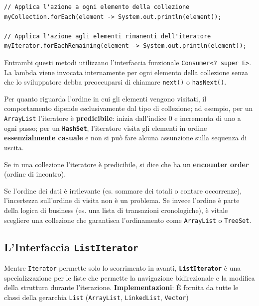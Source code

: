 \begin{lstlisting}[caption={Esempi di iterazione funzionale}]
// Applica l'azione a ogni elemento della collezione
myCollection.forEach(element -> System.out.println(element));

// Applica l'azione agli elementi rimanenti dell'iteratore
myIterator.forEachRemaining(element -> System.out.println(element));
\end{lstlisting}

Entrambi questi metodi utilizzano l'interfaccia funzionale \texttt{Consumer<? super E>}. La lambda viene invocata internamente per ogni elemento della collezione senza che lo sviluppatore debba preoccuparsi di chiamare \texttt{next()} o \texttt{hasNext()}.

Per quanto riguarda l'ordine in cui gli elementi vengono visitati, il comportamento dipende esclusivamente dal tipo di collezione; ad esempio, per un {\texttt{ArrayList}} l'iteratore è \textbf{predicibile}: inizia dall'indice 0 e incrementa di uno a ogni passo; per un \textbf{\texttt{HashSet}}, l'iteratore visita gli elementi in ordine \textbf{essenzialmente casuale} e non si può fare alcuna assunzione sulla sequenza di uscita.

Se in una collezione l'iteratore è predicibile, si dice che ha un \textbf{encounter order} (ordine di incontro).

\begin{tip}
Se l'ordine dei dati è irrilevante (es. sommare dei totali o contare occorrenze), l'incertezza sull'ordine di visita non è un problema. Se invece l'ordine è parte della logica di business (es. una lista di transazioni cronologiche), è vitale scegliere una collezione che garantisca l'ordinamento come \texttt{ArrayList} o \texttt{TreeSet}.
\end{tip}

\subsection{L'Interfaccia \texttt{ListIterator}}

Mentre \texttt{Iterator} permette solo lo scorrimento in avanti, \textbf{\texttt{ListIterator}} è una specializzazione per le liste che permette la navigazione bidirezionale e la modifica della struttura durante l'iterazione. \textbf{Implementazioni}: È fornita da tutte le classi della gerarchia \texttt{List} (\texttt{ArrayList}, \texttt{LinkedList}, \texttt{Vector})

